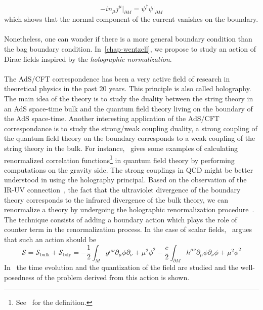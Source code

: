 \begin{equation*}
- i n_\mu j^\mu \big\vert_{\partial M} = \psi^\dagger\psi\big\vert_{\partial M}
\end{equation*}
which shows that the normal component of the current vanishes on the boundary. \\\\
Nonetheless, one can wonder if there is a more general boundary condition than the bag boundary condition. 
In~\cref{chap-wentzell}, we propose to study an action of Dirac fields inspired by the \textit{holographic normalization}. \\\\
%
The AdS/CFT correspondence has been a very active field of research in theoretical physics in the past 20 years. 
This principle is also called holography.
The main idea of the theory is to study the duality between the string theory in an AdS space-time bulk and the quantum field theory living on the boundary of the AdS space-time.
Another interesting application of the AdS/CFT correspondance is to study the strong/weak coupling duality, \ie
a strong coupling of the quantum field theory on the boundary corresponds to a weak coupling of the string theory in the bulk. 
For instance,~\cite{Skenderis2002} gives some examples of calculating renormalized correlation functions\footnote{
See~\eg\cite{Peskin1995} for the definition.
} in quantum field theory by performing computations on the gravity side.
The strong couplings in QCD might be better understood in using the holography principal. 
Based on the observation of the IR-UV connection~\cite{Susskind1998}, 
\ie the fact that the ultraviolet divergence of the boundary theory corresponds to the infrared divergence of the bulk theory, 
we can renormalize a theory by undergoing the holographic renormalization procedure~\cite{Skenderis2002}. 
The technique consists of adding a boundary action which plays the role of counter term in the renormalization process.
In the case of scalar fields,~\cite{Skenderis2002} argues that such an action should be
\begin{equation*}
\mathcal{S} = \mathcal{S}_{\mathrm{bulk}} + \mathcal{S}_{\mathrm{bdy}} = 
-\frac 1 2 \int_M g^{\mu\nu} \partial_\mu \phi \partial_{\nu} + 
\mu^2\phi^2 - \frac c 2 \int_{\partial M}h^{\mu\nu}\partial_\mu\phi\partial_\nu\phi + \mu^2\phi^2
\end{equation*}
In~\cite{Zahn2016} the time evolution and the quantization of the field are studied and the well-posedness of the problem derived from this action is shown.
